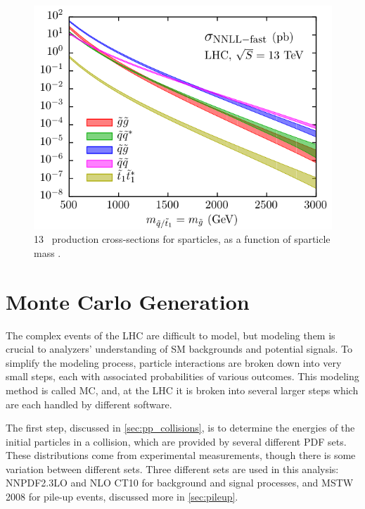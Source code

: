 \begin{centering}
\begin{figure}[!hbt]
\myfloatalign
\includegraphics[width=.9\linewidth]{figures/theory/nnllfast_wpresc_total.pdf}
\caption{ 13 \tev~production cross-sections for sparticles, as a function of sparticle mass \cite{1607.07741}.}
\label{fig:gluino_xs}
\end{figure}
\end{centering}


\section{Monte Carlo Generation}
\label{sec:MC_gen}

The complex events of the \ac{LHC} are difficult to model, but modeling them is crucial to analyzers' understanding of \ac{SM} backgrounds and potential signals. To simplify the modeling process, particle interactions are broken down into very small steps, each with associated probabilities of various outcomes. This modeling method is called \acf{MC}, and, at the \ac{LHC} it is broken into several larger steps which are each handled by different software. 

The first step, discussed in \autoref{sec:pp_collisions}, is to determine the energies of the initial particles in a collision, which are provided by several different \ac{PDF} sets. These distributions come from experimental measurements, though there is some variation between different sets. Three different sets are used in this analysis: NNPDF2.3LO \cite{Ball:2012cx} and NLO CT10 \cite{Lai:2010vv} for background and signal processes, and MSTW 2008 \cite{0901.0002} for pile-up events, discussed more in \autoref{sec:pileup}. 

